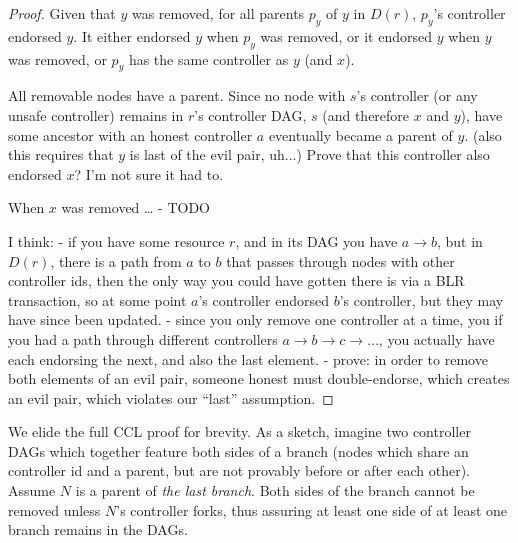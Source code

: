 \documentclass[a4paper,USenglish,cleveref, autoref, thm-restate, anonymous]{lipics-v2021}
\newcommand{\p}[1]{{\ensuremath{\left({{#1}}\right)}}}
\newcommand{\an}[1]{{\left\langle{{#1}}\right\rangle}}
\begin{document}
\begin{proof}
Given that $y$ was removed, for all parents $p_y$ of $y$ in $D\p r$, $p_y$'s controller endorsed $y$. 
It either endorsed $y$ when $p_y$ was removed, or it endorsed $y$ when $y$ was removed, or $p_y$ has the same controller as $y$ (and $x$). 

All removable nodes have a parent.
Since no node with $s$'s controller (or any unsafe controller) remains in $r$'s controller DAG, $s$ (and therefore $x$ and $y$), have some ancestor with an honest controller $a$ eventually became a parent of $y$. (also this requires that $y$ is last of the evil pair, uh...)
Prove that this controller also endorsed $x$? I'm not sure it had to.












When $x$ was removed \dots 
- TODO


I think:
- if you have some resource $r$, and in its DAG you have $a \rightarrow b$, but in $D\p r$, there is a path from $a$ to $b$ that passes through nodes with other controller ids, then the only way you could have gotten there is via a BLR transaction, so at some point $a$'s controller endorsed $b$'s controller, but they may have since been updated.
- since you only remove one controller at a time, you if you had a path through different controllers $a \rightarrow b \rightarrow c \rightarrow \dots$, you actually have each endorsing the next, and also the last element. 
- prove: in order to remove both elements of an evil pair, someone honest must double-endorse, which creates an evil pair, which violates our ``last'' assumption. 




\end{proof}

We elide the full CCL proof for brevity. 
As a sketch, imagine two controller DAGs which together feature both sides of a branch (nodes which share an controller id and a parent, but are not provably before or after each other).
Assume $N$ is a parent of \textit{the last branch}.
Both sides of the branch cannot be removed unless $N$'s controller forks, thus assuring at least one side of at least one branch remains in the DAGs. 
\end{document}
